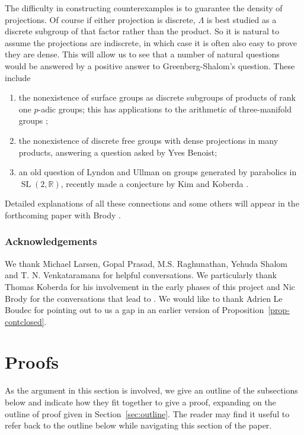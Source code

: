 \documentclass[11pt]{article}
\numberwithin{equation}{section}\providecommand{\llangle}{\langle\!\langle}\providecommand{\rrangle}{\rangle\!\rangle}\providecommand{\Asterisk}{\ast}
\newcommand{\bbR}{\ensuremath{\mathbb{R}}}
\DeclareMathOperator{\SL}{SL}
\theoremstyle{definition}
\begin{document}
The difficulty in constructing counterexamples is to guarantee the density of projections. Of course if either
projection is discrete, $\Lambda$ is best studied as a discrete subgroup of that factor rather than the product. So it is natural to assume the projections are indiscrete, in which case it is often also easy to prove they are dense. This will allow
us to see that a number of natural questions would be answered by a positive answer to Greenberg-Shalom's question. These include

\begin{enumerate}
\item the nonexistence of surface groups as discrete subgroups of products of rank one $p$-adic groups; this has applications to the arithmetic of three-manifold groups \cite{FLSS};
\item the nonexistence of discrete free groups with dense projections in many products, answering a question asked by Yves Benoist;
\item an old question of Lyndon and Ullman on groups generated by parabolics in $\SL(2,\bbR)$, recently made a conjecture by Kim and Koberda \cite{lyndon-ullman, kim-koberda-notfree}.
\end{enumerate}

Detailed explanations of all these connections and some others will appear in the forthcoming paper with Brody \cite{BFMVL}.

\subsubsection*{Acknowledgements} We thank Michael Larsen, Gopal Prasad, M.S. Raghunathan, Yehuda Shalom and T. N. Venkataramana for helpful conversations. We particularly thank Thomas Koberda for his involvement in the early phases of this project and Nic Brody for the conversations that lead to \cite{BFMVL}. We would like to thank Adrien Le Boudec for pointing out to us a gap in
an earlier version of Proposition~\ref{prop-contclosed}.

\section{Proofs}\label{sec:proof}

As the argument in this section is involved, we give an outline of the subsections
below and indicate how they fit together to give a proof, expanding on the outline of proof given in Section~\ref{sec:outline}. The reader may find it useful to refer back to the outline below while
navigating this section of the paper.
\end{document}
